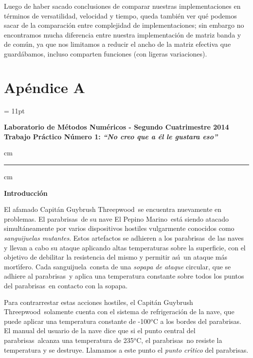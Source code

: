 \documentclass[spanish,a4paper]{article}
\begin{document}
Luego de haber sacado conclusiones de comparar nuestras implementaciones en términos de versatilidad, velocidad y tiempo, queda también ver qué podemos sacar de la comparación entre complejidad de implementaciones; sin embargo no encontramos mucha diferencia entre nuestra implementación de matriz banda y de común, ya que nos limitamos a reducir el ancho de la matriz efectiva que guardábamos, incluso comparten funciones (con ligeras variaciones).


\newpage
\section{Apéndice A}
\label{sec:ApA}

\parskip = 11pt

\newcommand{\real}{\mathbb{R}}
\newcommand{\nat}{\mathbb{N}}

\newcommand{\atacante}{sanguijuela}
\newcommand{\capitan}{Capit\'an Guybrush Threepwood}
\newcommand{\objeto}{parabrisas}
\newcommand{\nave}{El Pepino Marino}

\newcommand{\revJ}[1]{{\color{red} #1}}

\begin{centering}
\large\bf Laboratorio de M\'etodos Num\'ericos - Segundo Cuatrimestre 2014 \\
\large\bf Trabajo Pr\'actico N\'umero 1: \emph{``No creo que a \'el le gustara eso''}\\
\end{centering}


 cm
\hrule
{} cm

{\noindent \bf Introducci\'on}

El afamado \capitan\ se encuentra nuevamente en problemas. El
\objeto\ de su nave \nave\ est\'a siendo atacado simult\'aneamente por varios
dispositivos hostiles vulgarmente conocidos como \emph{\atacante s
mutantes}. Estos artefactos se adhieren a los \objeto\ de las naves y
llevan a cabo su ataque aplicando altas temperaturas sobre la superficie, con
el objetivo de debilitar la resistencia del mismo y permitir as\'\i \
un ataque m\'as mort\'\i fero. Cada \atacante\ consta de una \emph{sopapa
de ataque} circular, que se adhiere al \objeto\ y aplica una temperatura
constante sobre todos los puntos del \objeto\ en contacto con la sopapa.

Para con\-tra\-rres\-tar estas acciones hostiles, el \capitan\ 
solamente cuenta con el sistema de refrigeraci\'on de la nave, que puede
aplicar una temperatura constante de -100${}^o$C a los bordes del \objeto.
El manual del usuario de la nave dice que si el punto central del \objeto\ 
alcanza una temperatura de 235${}^o$C, el \objeto\ no resiste la temperatura
y se destruye. Llamamos a este punto el \emph{punto cr\'\i tico} del
\objeto.
\end{document}

